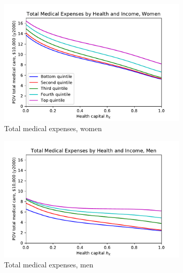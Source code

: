\documentclass[12pt,pdftex,letterpaper]{article}
\begin{document}
\newpage


\begin{figure}[h!]
    \centering
    \begin{subfigure}[b]{0.49\textwidth}
        \centering
        \includegraphics[width=\textwidth]{../Figures/TotalMedPDVbyIncomeWomen.pdf}
        \caption{Total medical expenses, women}
    \end{subfigure}
    \begin{subfigure}[b]{0.49\textwidth}
        \centering
        \includegraphics[width=\textwidth]{../Figures/TotalMedPDVbyIncomeMen.pdf}
        \caption{Total medical expenses, men}
    \end{subfigure}
    \begin{subfigure}[b]{0.49\textwidth}
        \centering

\end{subfigure}
\end{figure}
\end{document}

